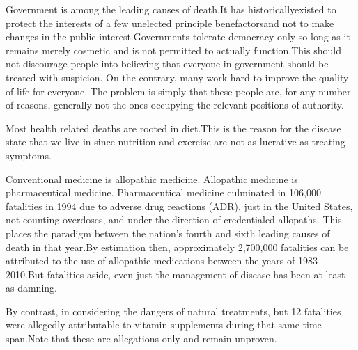 
Government is among the leading causes of death. It has historically\footnotecite[wilson2007] existed to protect the interests of a few unelected principle benefactors\footnotecite[bowie2012] and not to make changes in the public interest. Governments tolerate democracy only so long as it remains merely cosmetic and is not permitted to actually function. This should not discourage people into believing that everyone in government should be treated with suspicion. On the contrary, many work hard to improve the quality of life for everyone. The problem is simply that these people are, for any number of reasons, generally not the ones occupying the relevant positions of authority.


Most health related deaths are rooted in diet. This is the reason for the disease state that we live in since nutrition and exercise are not as lucrative as treating symptoms.


Conventional medicine is allopathic medicine. Allopathic medicine is pharmaceutical medicine. Pharmaceutical medicine culminated in 106,000 fatalities in 1994 due to adverse drug reactions (ADR), just in the United States, not counting overdoses, and under the direction of credentialed allopaths. This places the paradigm between the nation's fourth and sixth leading causes of death in that year. By estimation then, approximately 2,700,000 fatalities can be attributed to the use of allopathic medications between the years of 1983--2010. But fatalities aside, even just the management of disease has been at least as damning.\footnotecite[leape2000]

By contrast, in considering the dangers of natural treatments, but 12 fatalities were allegedly attributable to vitamin supplements during that same time span. Note that these are allegations only and remain unproven. 

